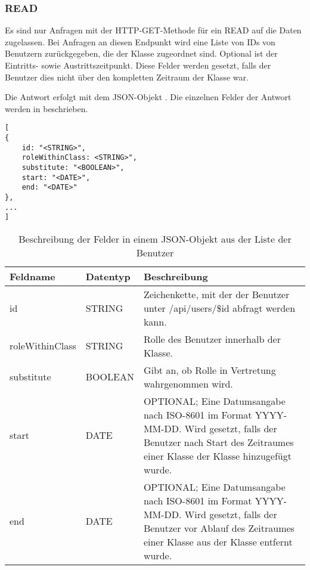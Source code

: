 \subsubsection{READ}
\label{sec:rest:api:classes:id:users:read}
Es sind nur Anfragen mit der HTTP-GET-Methode für ein READ auf die Daten zugelassen.
Bei Anfragen an diesen Endpunkt wird eine Liste von IDs von Benutzern zurückgegeben, die der Klasse zugeordnet sind.
Optional ist der Eintritts- sowie Austrittszeitpunkt. Diese Felder werden gesetzt, falls der Benutzer dies nicht über den kompletten Zeitraum der Klasse war.

Die Antwort erfolgt mit dem JSON-Objekt . 
Die einzelnen Felder der Antwort werden in  beschrieben.

\begin{lstlisting}[caption={JSON-Antwort für einen GET-Aufruf des Pfads /api/classes/\$id/users},label={lst:code:rest:api:classes:id:users:read:ret},frame=tlrb]
[
{
    id: "<STRING>",
    roleWithinClass: <STRING>",
    substitute: "<BOOLEAN>",
    start: "<DATE>",
    end: "<DATE>"    
},
...
]
\end{lstlisting}

\begin{longtable}{|p{}|p{}|p{}|}
		\caption{Beschreibung der Felder in einem JSON-Objekt aus der Liste der Benutzer}
\endfoot
		\caption{Beschreibung der Felder in einem JSON-Objekt aus der Liste der Benutzer}
		\label{tab:rest:api:classes:id:users:read:ret}
\endlastfoot 
\hline
			\textbf{Feldname} & \textbf{Datentyp} & \textbf{Beschreibung} \\ \hline
\endhead
id & STRING & Zeichenkette, mit der der Benutzer unter /api/users/\$id abfragt werden kann. \\ \hline
roleWithinClass & STRING & Rolle des Benutzer innerhalb der Klasse. \\ \hline
substitute & BOOLEAN & Gibt an, ob Rolle in Vertretung wahrgenommen wird. \\ \hline
start & DATE & OPTIONAL; Eine Datumsangabe nach ISO-8601 im Format YYYY-MM-DD. Wird gesetzt, falls der Benutzer nach Start des Zeitraumes einer Klasse der Klasse hinzugefügt wurde. \\ \hline
end & DATE & OPTIONAL; Eine Datumsangabe nach ISO-8601 im Format YYYY-MM-DD. Wird gesetzt, falls der Benutzer vor Ablauf des Zeitraumes einer Klasse aus der Klasse entfernt wurde. \\ \hline
\end{longtable}
